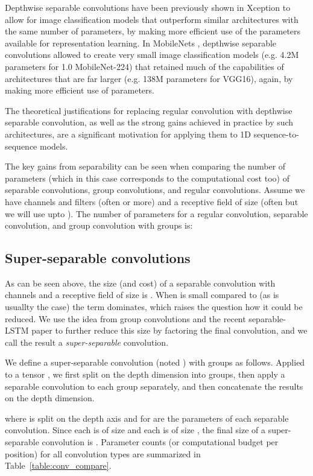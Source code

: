 \documentclass{article}
\begin{document}
Depthwise separable convolutions have been previously shown in Xception \citep{xception2016} to allow for image classification models that outperform similar architectures with the same number of parameters, by making more efficient use of the parameters available for representation learning. In MobileNets \citep{mobilenets2017}, depthwise separable convolutions allowed to create very small image classification models (e.g. 4.2M parameters for 1.0 MobileNet-224) that retained much of the capabilities of architectures that are far larger (e.g. 138M parameters for VGG16), again, by making more efficient use of parameters.

The theoretical justifications for replacing regular convolution with depthwise separable convolution, as well as the strong gains achieved in practice by such architectures, are a significant motivation for applying them to 1D sequence-to-sequence models.

The key gains from separability can be seen when comparing the number of parameters (which in this case corresponds to the computational cost too) of separable convolutions, group convolutions, and regular convolutions. Assume we have  channels and filters (often  or more) and a receptive field of size  (often  but we will use  upto ). The number of parameters for a regular convolution, separable convolution, and group convolution with  groups is:


\subsection{Super-separable convolutions}

As can be seen above, the size (and cost) of a separable convolution with  channels and a receptive field of size  is .
When  is small compared to  (as is usuallty the case) the term  dominates, which raises the question how it could be reduced.
We use the idea from group convolutions and the recent separable-LSTM paper \cite{factlstm} to further reduce this size by factoring the final  convolution, and we call the result a \emph{super-separable} convolution.

We define a super-separable convolution (noted ) with  groups as follows. Applied to a tensor , we first split  on the depth dimension into  groups, then apply a separable convolution to each group separately, and then concatenate the results on the depth dimension.

where  is  split on the depth axis and  for  are the parameters of each separable convolution. Since each  is of size  and each  is of size , the final size
of a super-separable convolution is .
Parameter counts (or computational budget per position) for all convolution types are summarized in Table~\ref{table:conv_compare}.
\end{document}
